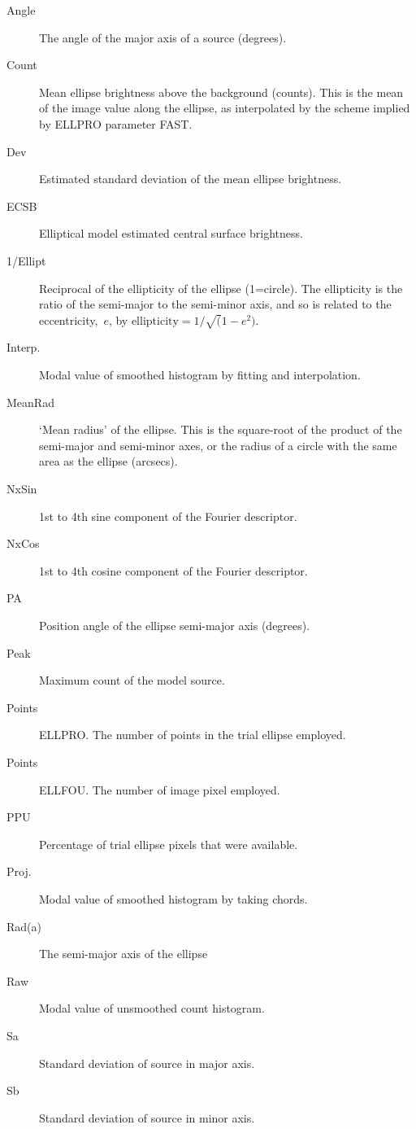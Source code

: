 \documentclass[twoside,11pt]{article}
\newenvironment{myquote}{\begin{quote}\begin{small}}{\end{small}\end{quote}}
\begin{document}
\begin{description}
\item[Angle]The angle of the major axis of a source (degrees).
\item[Count]Mean ellipse brightness above the background (counts).
This is the mean of the image value along the ellipse, as interpolated
by the scheme implied by ELLPRO parameter FAST.
\item[Dev]Estimated standard deviation of the mean ellipse brightness.
\item[ECSB]Elliptical model estimated central surface brightness.
\item[1/Ellipt]Reciprocal of the ellipticity of the ellipse
(1=circle).  The ellipticity is the ratio
of the semi-major to the semi-minor axis, and so is related to the
eccentricity,~$e$, by $\mbox{ellipticity}=1/\sqrt(1-e^2)$.
\item[Interp.]Modal value of smoothed histogram by fitting and interpolation.
\item[MeanRad]`Mean radius' of the ellipse.  This is the square-root of
the product of the semi-major and semi-minor axes, or the radius of a
circle with the same area as the ellipse (arcsecs).
\item[NxSin]1st to 4th sine component of the Fourier descriptor.
\item[NxCos]1st to 4th cosine component of the Fourier descriptor.
\item[PA]Position angle of the ellipse semi-major axis (degrees).
\item[Peak]Maximum count of the model source.
\item[Points]ELLPRO. The number of points in the trial ellipse employed.
\item[Points]ELLFOU. The number of image pixel employed.
\item[PPU]Percentage of trial ellipse pixels that were available.
\item[Proj.]Modal value of smoothed histogram by taking chords.
\item[Rad(a)]The semi-major axis of the ellipse
\item[Raw]Modal value of unsmoothed count histogram.
\item[Sa]Standard deviation of source in major axis.
\item[Sb]Standard deviation of source in minor axis.

\end{description}
\end{document}
